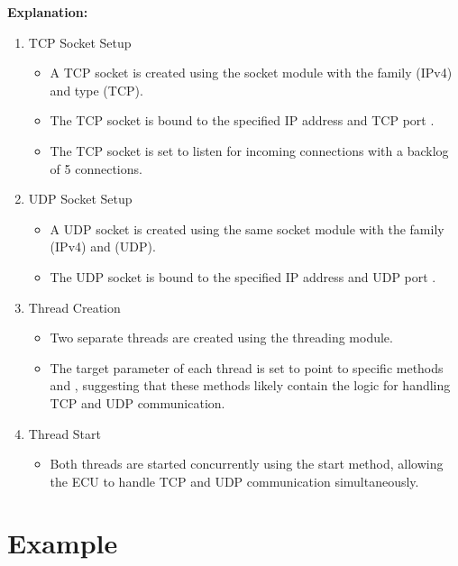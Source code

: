 \textbf{Explanation:}
\begin{enumerate}
   \item TCP Socket Setup
      \begin{itemize}
         \item A TCP socket is created using the socket module with the  family (IPv4) and  type (TCP).
         \item The TCP socket is bound to the specified IP address  and TCP port .
         \item The TCP socket is set to listen for incoming connections with a backlog of 5 connections.
      \end{itemize}
   \item UDP Socket Setup
      \begin{itemize}
         \item A UDP socket is created using the same socket module with the  family (IPv4) and  (UDP).
         \item The UDP socket is bound to the specified IP address  and UDP port .
      \end{itemize}
   \item Thread Creation
   \begin{itemize}
      \item Two separate threads  are created using the threading module.
      \item The target parameter of each thread is set to point to specific methods  and , suggesting that these methods likely contain the logic for handling TCP and UDP communication.
   \end{itemize}
   \item Thread Start
   \begin{itemize}
      \item Both threads are started concurrently using the start method, allowing the ECU to handle TCP and UDP communication simultaneously.
   \end{itemize}
\end{enumerate}

\newpage

\section{Example}

